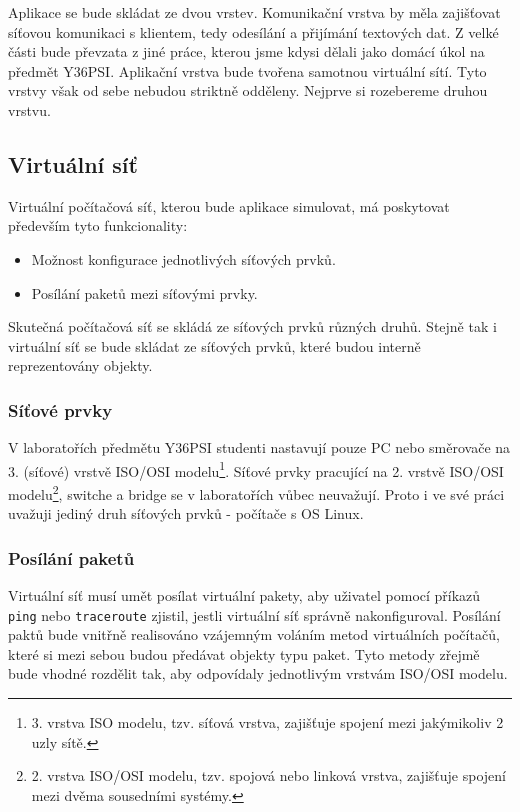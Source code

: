 Aplikace se bude skládat ze dvou vrstev. Komunikační vrstva by měla zajišťovat síťovou komunikaci s klientem, tedy odesílání a přijímání textových dat. Z velké části bude převzata z jiné práce, kterou jsme kdysi dělali jako domácí úkol na předmět Y36PSI. Aplikační vrstva bude tvořena samotnou virtuální sítí. Tyto vrstvy však od sebe nebudou striktně odděleny. Nejprve si rozebereme druhou vrstvu.


\subsection{Virtuální síť}

Virtuální počítačová síť, kterou bude aplikace simulovat, má poskytovat především tyto funkcionality:
\begin{itemize}
 \item Možnost konfigurace jednotlivých síťových prvků.
 \item Posílání paketů mezi síťovými prvky.
\end{itemize}
Skutečná počítačová síť se skládá ze síťových prvků různých druhů. Stejně tak i virtuální síť se bude skládat ze síťových prvků, které budou interně reprezentovány objekty.

\subsubsection{Síťové prvky}

V laboratořích předmětu Y36PSI studenti nastavují pouze PC nebo směrovače na 3. (síťové) vrstvě ISO/OSI modelu\footnote{3. vrstva ISO modelu, tzv. síťová vrstva, zajišťuje spojení mezi jakýmikoliv 2 uzly sítě.}. Síťové prvky pracující na 2. vrstvě ISO/OSI modelu\footnote{2. vrstva ISO/OSI modelu, tzv. spojová nebo linková vrstva, zajišťuje spojení mezi dvěma sousedními systémy.}, switche a bridge se v laboratořích vůbec neuvažují. Proto i ve své práci uvažuji jediný druh síťových prvků - počítače s OS Linux.

\subsubsection{Posílání paketů}
Virtuální síť musí umět posílat virtuální pakety, aby uživatel pomocí příkazů \verb|ping| nebo \verb|traceroute| zjistil, jestli virtuální síť správně nakonfiguroval. Posílání paktů bude vnitřně realisováno vzájemným voláním metod virtuálních počítačů, které si mezi sebou budou předávat objekty typu paket. Tyto metody zřejmě bude vhodné rozdělit tak, aby odpovídaly jednotlivým vrstvám ISO/OSI modelu.


